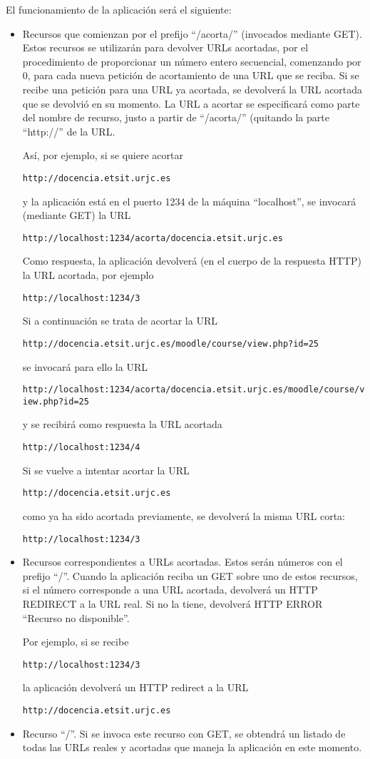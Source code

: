 El funcionamiento de la aplicación será el siguiente:

\begin{itemize}
\item Recursos que comienzan por el prefijo ``/acorta/'' (invocados mediante GET). Estos recursos se utilizarán para devolver URLs acortadas, por el procedimiento de proporcionar un número entero secuencial, comenzando por 0, para cada nueva petición de acortamiento de una URL que se reciba. Si se recibe una petición para una URL ya acortada, se devolverá la URL acortada que se devolvió en su momento. La URL a acortar se especificará como parte del nombre de recurso, justo a partir de ``/acorta/'' (quitando la parte ``http://'' de la URL.

Así, por ejemplo, si se quiere acortar

\verb|http://docencia.etsit.urjc.es|

y la aplicación está en el puerto 1234 de la máquina ``localhost'', se invocará (mediante GET) la URL

\verb|http://localhost:1234/acorta/docencia.etsit.urjc.es|

Como respuesta, la aplicación devolverá (en el cuerpo de la respuesta HTTP) la URL acortada, por ejemplo

\verb|http://localhost:1234/3|

Si a continuación se trata de acortar la URL

\verb|http://docencia.etsit.urjc.es/moodle/course/view.php?id=25|

se invocará para ello la URL

\verb|http://localhost:1234/acorta/docencia.etsit.urjc.es/moodle/course/view.php?id=25|

y se recibirá como respuesta la URL acortada

\verb|http://localhost:1234/4|

Si se vuelve a intentar acortar la URL

\verb|http://docencia.etsit.urjc.es|

como ya ha sido acortada previamente, se devolverá la misma URL corta:

\verb|http://localhost:1234/3|

\item Recursos correspondientes a URLs acortadas. Estos serán números con el prefijo ``/''. Cuando la aplicación reciba un GET sobre uno de estos recursos, si el número corresponde a una URL acortada, devolverá un HTTP REDIRECT a la URL real. Si no la tiene, devolverá HTTP ERROR ``Recurso no disponible''.

Por ejemplo, si se recibe 

\verb|http://localhost:1234/3|

la aplicación devolverá un HTTP redirect a la URL

\verb|http://docencia.etsit.urjc.es|

\item Recurso ``/''. Si se invoca este recurso con GET, se obtendrá un listado de todas las URLs reales y acortadas que maneja la aplicación en este momento.
\end{itemize}

